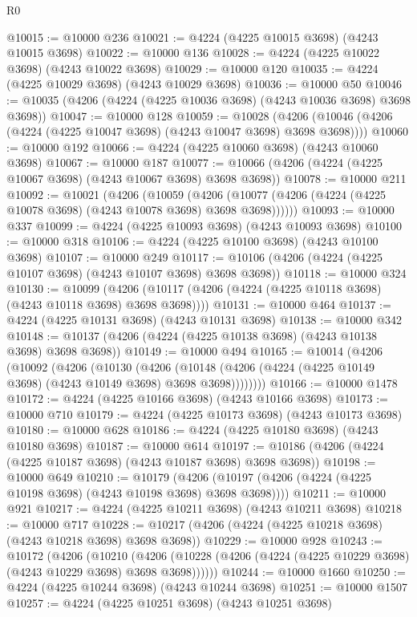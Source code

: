 \begin{lexlean}{R0}
\begin{coremodule}
@10015 := @10000 @236
@10021 := @4224 (@4225 @10015 @3698) (@4243 @10015 @3698)
@10022 := @10000 @136
@10028 := @4224 (@4225 @10022 @3698) (@4243 @10022 @3698)
@10029 := @10000 @120
@10035 := @4224 (@4225 @10029 @3698) (@4243 @10029 @3698)
@10036 := @10000 @50
@10046 := @10035 (@4206 (@4224 (@4225 @10036 @3698) (@4243 @10036 @3698) @3698 @3698))
@10047 := @10000 @128
@10059 := @10028
    (@4206 (@10046 (@4206 (@4224 (@4225 @10047 @3698) (@4243 @10047 @3698) @3698 @3698))))
@10060 := @10000 @192
@10066 := @4224 (@4225 @10060 @3698) (@4243 @10060 @3698)
@10067 := @10000 @187
@10077 := @10066 (@4206 (@4224 (@4225 @10067 @3698) (@4243 @10067 @3698) @3698 @3698))
@10078 := @10000 @211
@10092 := @10021
    (@4206
      (@10059
        (@4206 (@10077 (@4206 (@4224 (@4225 @10078 @3698) (@4243 @10078 @3698) @3698 @3698))))))
@10093 := @10000 @337
@10099 := @4224 (@4225 @10093 @3698) (@4243 @10093 @3698)
@10100 := @10000 @318
@10106 := @4224 (@4225 @10100 @3698) (@4243 @10100 @3698)
@10107 := @10000 @249
@10117 := @10106 (@4206 (@4224 (@4225 @10107 @3698) (@4243 @10107 @3698) @3698 @3698))
@10118 := @10000 @324
@10130 := @10099
    (@4206 (@10117 (@4206 (@4224 (@4225 @10118 @3698) (@4243 @10118 @3698) @3698 @3698))))
@10131 := @10000 @464
@10137 := @4224 (@4225 @10131 @3698) (@4243 @10131 @3698)
@10138 := @10000 @342
@10148 := @10137 (@4206 (@4224 (@4225 @10138 @3698) (@4243 @10138 @3698) @3698 @3698))
@10149 := @10000 @494
@10165 := @10014
    (@4206
      (@10092
        (@4206
          (@10130
            (@4206
              (@10148 (@4206 (@4224 (@4225 @10149 @3698) (@4243 @10149 @3698) @3698 @3698))))))))
@10166 := @10000 @1478
@10172 := @4224 (@4225 @10166 @3698) (@4243 @10166 @3698)
@10173 := @10000 @710
@10179 := @4224 (@4225 @10173 @3698) (@4243 @10173 @3698)
@10180 := @10000 @628
@10186 := @4224 (@4225 @10180 @3698) (@4243 @10180 @3698)
@10187 := @10000 @614
@10197 := @10186 (@4206 (@4224 (@4225 @10187 @3698) (@4243 @10187 @3698) @3698 @3698))
@10198 := @10000 @649
@10210 := @10179
    (@4206 (@10197 (@4206 (@4224 (@4225 @10198 @3698) (@4243 @10198 @3698) @3698 @3698))))
@10211 := @10000 @921
@10217 := @4224 (@4225 @10211 @3698) (@4243 @10211 @3698)
@10218 := @10000 @717
@10228 := @10217 (@4206 (@4224 (@4225 @10218 @3698) (@4243 @10218 @3698) @3698 @3698))
@10229 := @10000 @928
@10243 := @10172
    (@4206
      (@10210
        (@4206 (@10228 (@4206 (@4224 (@4225 @10229 @3698) (@4243 @10229 @3698) @3698 @3698))))))
@10244 := @10000 @1660
@10250 := @4224 (@4225 @10244 @3698) (@4243 @10244 @3698)
@10251 := @10000 @1507
@10257 := @4224 (@4225 @10251 @3698) (@4243 @10251 @3698)

\end{coremodule}
\end{lexlean}
